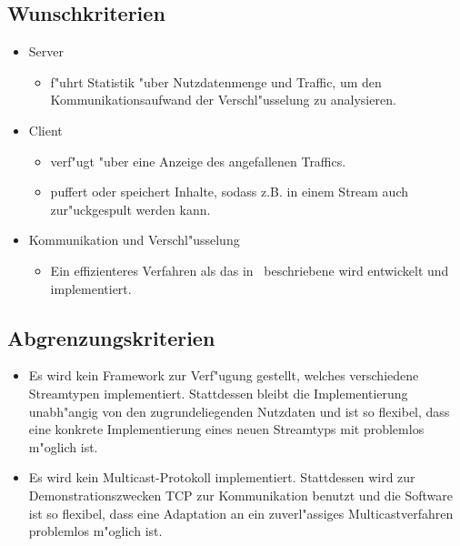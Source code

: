 \documentclass[a4paper,10pt]{article}
\begin{document}
\subsection{Wunschkriterien}

\begin{itemize}

\item Server
\begin{itemize}
   \item f"uhrt Statistik "uber Nutzdatenmenge und Traffic, um den Kommunikationsaufwand
         der Verschl"usselung zu analysieren.
\end{itemize}

\item Client
\begin{itemize}
   \item verf"ugt "uber eine Anzeige des angefallenen Traffics.
   \item puffert oder speichert Inhalte, sodass z.B. in einem Stream auch
         zur"uckgespult werden kann.
\end{itemize}

\item Kommunikation und Verschl"usselung
\begin{itemize}
   \item Ein effizienteres Verfahren als das in~\cite{Naor00} beschriebene wird
         entwickelt und implementiert.
\end{itemize}
\end{itemize}

\subsection{Abgrenzungskriterien}
\begin{itemize}
   \item Es wird kein Framework zur Verf"ugung gestellt, welches verschiedene
         Streamtypen implementiert. Stattdessen bleibt die Implementierung
         unabh"angig von den zugrundeliegenden Nutzdaten und ist so flexibel,
         dass eine konkrete Implementierung eines neuen Streamtyps mit
         problemlos m"oglich ist.
   \item Es wird kein Multicast-Protokoll implementiert. Stattdessen wird
         zur Demonstrationszwecken TCP zur Kommunikation benutzt und die Software
         ist so flexibel, dass eine Adaptation an ein zuverl"assiges
         Multicastverfahren problemlos m"oglich ist.
\end{itemize}
\end{document}
